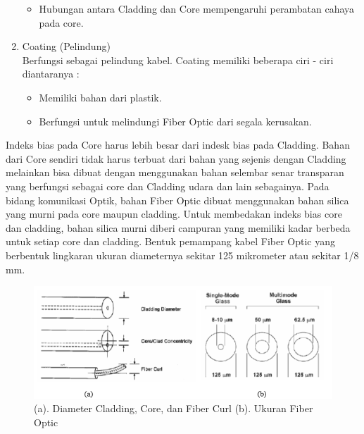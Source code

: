 \begin{flushleft}
\begin{enumerate}
\begin{itemize}
	\item Hubungan antara Cladding dan Core mempengaruhi perambatan cahaya pada core.
	\end{itemize}
\item Coating (Pelindung) \\ Berfungsi sebagai pelindung kabel. Coating memiliki beberapa ciri - ciri diantaranya : \\
	\begin{itemize}
	\item Memiliki bahan dari plastik.
	\item Berfungsi untuk melindungi Fiber Optic dari segala kerusakan.
	\end{itemize}
\end{enumerate}
\end{flushleft}
\begin{flushleft}
Indeks bias pada Core harus lebih besar dari indesk bias pada Cladding. Bahan dari Core sendiri tidak harus terbuat dari bahan yang sejenis dengan Cladding melainkan bisa dibuat dengan menggunakan bahan selembar senar transparan yang berfungsi sebagai core dan Cladding udara dan lain sebagainya. Pada bidang komunikasi Optik, bahan Fiber Optic dibuat menggunakan bahan silica yang murni pada core maupun cladding. Untuk membedakan indeks bias core dan cladding, bahan silica murni diberi campuran yang memiliki kadar berbeda untuk setiap core dan cladding. Bentuk pemampang kabel Fiber Optic yang berbentuk lingkaran ukuran diameternya sekitar 125 mikrometer atau sekitar 1/8 mm.
\begin{figure}[ht]
\centerline{\includegraphics[width=1\textwidth]{figures/sizeanddiameter.png}}
\caption{(a). Diameter Cladding, Core, dan Fiber Curl  (b). Ukuran Fiber Optic}
\label{Skema Fiber Optic}
\end{figure}
\end{flushleft}
